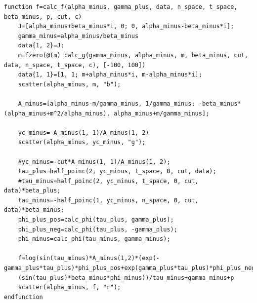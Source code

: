 \begin{lstlisting}[caption={C\'{a}lculo de $f'(\alpha^-)$.}, captionpos=b]
function f=calc_f(alpha_minus, gamma_plus, data, n_space, t_space, beta_minus, p, cut, c)
    J=[alpha_minus+beta_minus*i, 0; 0, alpha_minus-beta_minus*i];
    gamma_minus=alpha_minus/beta_minus
    data{1, 2}=J;
    m=fzero(@(m) calc_g(gamma_minus, alpha_minus, m, beta_minus, cut, data, n_space, t_space, c), [-100, 100])
    data{1, 1}=[1, 1; m+alpha_minus*i, m-alpha_minus*i];
    scatter(alpha_minus, m, "b");
    
    A_minus=[alpha_minus-m/gamma_minus, 1/gamma_minus; -beta_minus*(alpha_minus+m^2/alpha_minus), alpha_minus+m/gamma_minus];
    
    yc_minus=-A_minus(1, 1)/A_minus(1, 2)
    scatter(alpha_minus, yc_minus, "g");
    
    #yc_minus=-cut*A_minus(1, 1)/A_minus(1, 2);
    tau_plus=half_poinc(2, yc_minus, t_space, 0, cut, data);
    #tau_minus=half_poinc(2, yc_minus, t_space, 0, cut, data)*beta_plus;
    tau_minus=-half_poinc(1, yc_minus, n_space, 0, cut, data)*beta_minus;
    phi_plus_pos=calc_phi(tau_plus, gamma_plus);
    phi_plus_neg=calc_phi(tau_plus, -gamma_plus);
    phi_minus=calc_phi(tau_minus, gamma_minus);
    
    f=log(sin(tau_minus)*A_minus(1,2)*(exp(-gamma_plus*tau_plus)*phi_plus_pos+exp(gamma_plus*tau_plus)*phi_plus_neg)/
    (sin(tau_plus)*beta_minus*phi_minus))/tau_minus+gamma_minus+p
    scatter(alpha_minus, f, "r");
endfunction
\end{lstlisting}
